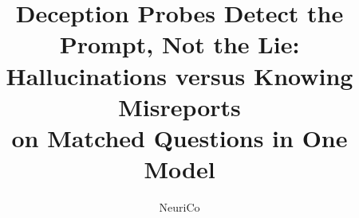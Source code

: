 \documentclass{article}
\title{Deception Probes Detect the Prompt, Not the Lie:\\ Hallucinations versus Knowing Misreports\\ on Matched Questions in One Model}
\author{NeuriCo}
\begin{document}
\maketitle

\begin{abstract}

\end{abstract}










\appendix

\end{document}

